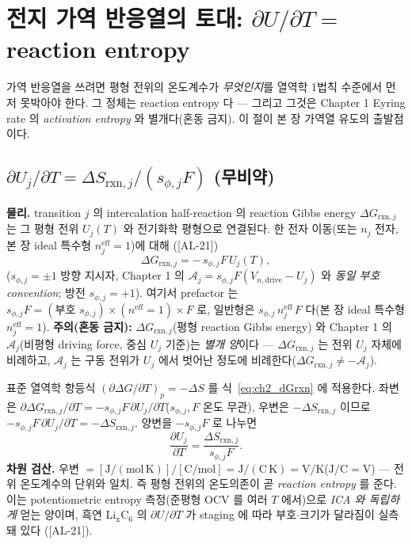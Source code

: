 \documentclass[11pt,a4paper]{article}
\newcommand{\eff}{\mathrm{eff}}
\newcommand{\drive}{\mathrm{drive}}
\newcommand{\rxn}{\mathrm{rxn}}
\newcommand{\AL}[1]{\textsf{[AL-#1]}}
\begin{document}
\section{전지 가역 반응열의 토대: $\partial U/\partial T=$ reaction entropy}\label{sec:ch2_entropy}
가역 반응열을 쓰려면 평형 전위의 온도계수가 \emph{무엇인지}를 열역학 1법칙 수준에서 먼저 못박아야 한다. 그
정체는 reaction entropy 다 — 그리고 그것은 Chapter 1 Eyring rate 의 \emph{activation entropy} 와 별개다(혼동
금지). 이 절이 본 장 가역열 유도의 출발점이다.

\subsection{$\partial U_j/\partial T=\Delta S_{\rxn,j}/(s_{\phi,j}F)$ (무비약)}\label{sec:ch2_dUdT}
\textbf{물리.} transition $j$ 의 intercalation half-reaction 의 reaction Gibbs energy $\Delta G_{\rxn,j}$ 는
그 평형 전위 $U_j(T)$ 와 전기화학 평형으로 연결된다. 한 전자 이동(또는 $n_j$ 전자, 본 장 ideal 특수형
$n_j^{\eff}=1$)에 대해 \cite{bardfaulkner,newman}(\AL{21})
\begin{equation}
\Delta G_{\rxn,j}=-\,s_{\phi,j}F\,U_j(T),
\label{eq:ch2_dGrxn}
\end{equation}
($s_{\phi,j}=\pm1$ 방향 지시자, Chapter 1 의 $\mathcal A_j=s_{\phi,j}F(V_{n,\drive}-U_j)$ 와 \emph{동일 부호
convention}; 방전 $s_{\phi,j}=+1$). 여기서 prefactor 는 $s_{\phi,j}F=(\text{부호 }s_{\phi,j})\times(n^{\eff}=1)\times F$
로, 일반형은 $s_{\phi,j}\,n_j^{\eff}\,F$ 다(본 장 ideal 특수형 $n_j^{\eff}=1$). \textbf{주의(혼동 금지):} $\Delta G_{\rxn,j}$(평형 reaction Gibbs energy)
와 Chapter 1 의 $\mathcal A_j$(비평형 driving force, 중심 $U_j$ 기준)는 \emph{별개 양}이다 — $\Delta G_{\rxn,j}$
는 전위 $U_j$ 자체에 비례하고, $\mathcal A_j$ 는 구동 전위가 $U_j$ 에서 벗어난 정도에 비례한다($\Delta G_{\rxn,j}\ne-\mathcal A_j$).

표준 열역학 항등식 $(\partial\Delta G/\partial T)_p=-\Delta S$ 를 식~\eqref{eq:ch2_dGrxn} 에 적용한다. 좌변은
$\partial\Delta G_{\rxn,j}/\partial T=-s_{\phi,j}F\,\partial U_j/\partial T$($s_{\phi,j},F$ 온도 무관), 우변은
$-\Delta S_{\rxn,j}$ 이므로 $-s_{\phi,j}F\,\partial U_j/\partial T=-\Delta S_{\rxn,j}$. 양변을 $-s_{\phi,j}F$
로 나누면
\begin{equation}
\boxed{\;\frac{\partial U_j}{\partial T}=\frac{\Delta S_{\rxn,j}}{s_{\phi,j}F}.\;}
\label{eq:ch2_entropy_coeff}
\end{equation}
\textbf{차원 검산.} 우변 $=[\mathrm{J/(mol\,K)}]/[\mathrm{C/mol}]=\mathrm{J/(C\,K)}=\mathrm{V/K}$($\mathrm{J/C}=\mathrm V$)
— 전위 온도계수의 단위와 일치. 즉 평형 전위의 온도의존이 곧 \emph{reaction entropy} 를 준다. 이는
potentiometric entropy 측정(준평형 OCV 를 여러 $T$ 에서)으로 \emph{ICA 와 독립하게} 얻는 양이며, 흑연
$\mathrm{Li_xC_6}$ 의 $\partial U/\partial T$ 가 staging 에 따라 부호$\cdot$크기가 달라짐이 실측돼 있다
\cite{reynier2004,thomasnewman2003}(\AL{21}).
\end{document}
